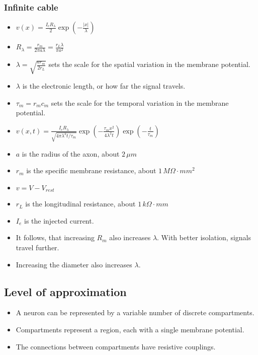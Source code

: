 \documentclass[main]{subfiles}
\begin{document}
\subsubsection{Infinite cable}
\begin{figure}[H]
	\centering
\end{figure}
\begin{itemize}[noitemsep,nolistsep]
	\item $v(x) = \frac{I_eR_\lambda}{2}\exp(-\frac{|x|}{\lambda})$
	\item $R_\lambda=\frac{r_m}{2\pi a\lambda} = \frac{r_L\lambda}{\pi a^2}$
	\item $\lambda = \sqrt{\frac{ar_m}{2r_L}}$ sets the scale for the spatial variation in the membrane potential.
	\item $\lambda$ is the electronic length, or how far the signal travels.
	\item $\tau_m = r_mc_m$ sets the scale for the temporal variation in the membrane potential.
	\item $v(x,t) = \frac{I_eR_\lambda}{\sqrt{4\pi\lambda^2t/\tau_m}}\exp(-\frac{\tau_mx^2}{4\lambda^2t})\exp(-\frac{t}{\tau_m})$
	\item $a$ is the radius of the axon, about $2\,\mu m$
	\item $r_m$ is the specific membrane resistance, about $1\,M\Omega\cdot mm^2$
	\item $v = V - V_{rest}$
	\item $r_L$ is the longitudinal resistance, about $1\,k\Omega\cdot mm$
	\item $I_e$ is the injected current.
	\item It follows, that increasing $R_m$ also increases $\lambda$. With better isolation, signals travel further.
	\item Increasing the diameter also increases $\lambda$.
\end{itemize}

\subsection{Level of approximation}
\begin{itemize}[noitemsep,nolistsep]
	\item A neuron can be represented by a variable number of discrete compartments.
	\item Compartments represent a region, each with a single membrane potential.
	\item The connections between compartments have resistive couplings.
\end{itemize}
\end{document}
